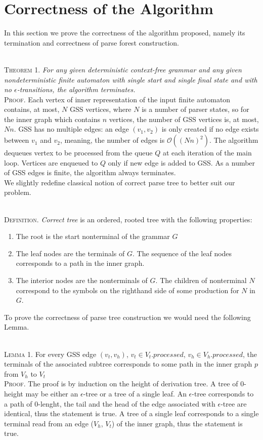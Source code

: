 \section{Correctness of the Algorithm}
In this section we prove the correctness of the algorithm proposed, namely its termination 
and correctness of parse forest construction.

~\\
\textsc{Theorem 1.}
\textit{For any given deterministic context-free grammar and any given nondeterministic
finite automaton with single start and single final state and with no $\epsilon$-transitions,
the algorithm terminates.}
~\\
\textsc{Proof.}
Each vertex of inner representation of the input finite automaton contains, at most, 
$N$ GSS vertices, where $N$ is a number of parser states, so for the inner graph which contains $n$
vertices, the number of GSS vertices is, at most, $Nn$. GSS has no multiple edges:
an edge $(v_{1}, v_{2})$ is only created if no edge exists between $v_{1}$ and $v_{2}$,  
meaning, the number of edges is $\mathcal{O}((Nn)^2)$. 
The algorithm dequeues vertex to be processed from the queue $Q$ at each iteration of the 
main loop. Vertices are enqueued to $Q$ only if new edge is added to GSS. As a number of 
GSS edges is finite, the algorithm always terminates. 
~\\

We slightly redefine classical notion of correct parse tree to better suit our problem.

~\\
\textsc{Definition.} 
\emph{Correct tree} is an ordered, rooted tree with the following properties:
\begin{enumerate}
  \item The root is the start nonterminal of the grammar $G$
  \item The leaf nodes are the terminals of $G$. The sequence of the leaf nodes 
        corresponds to a path in the inner graph. 
  \item The interior nodes are the nonterminals of $G$. The children of nonterminal 
        $N$ correspond to the symbols on the righthand side of some production for $N$ in $G$.
\end{enumerate}

To prove the correctness of parse tree construction we would need the following Lemma.

~\\
\textsc{Lemma 1.}
For every GSS edge $(v_{t}, v_{h})$, $v_{t} \in V_{t}.processed$, $v_{h} \in V_{h}.processed$, 
the terminals of the associated subtree corresponds to some path in the inner graph $p$ from $V_{h}$ to $V_{t}$
~\\
\textsc{Proof.}
The proof is by induction on the height of derivation tree. 
A tree of 0-height may be either an $\epsilon$-tree or a tree of a single leaf.
An $\epsilon$-tree corresponds to a path of 0-lenght, the tail and the head of the edge associated with 
$\epsilon$-tree are identical, thus the statement is true. A tree of a single leaf corresponds to a single 
terminal read from an edge ($V_{h}$, $V_{t}$) of the inner graph, thus the statement is true.

